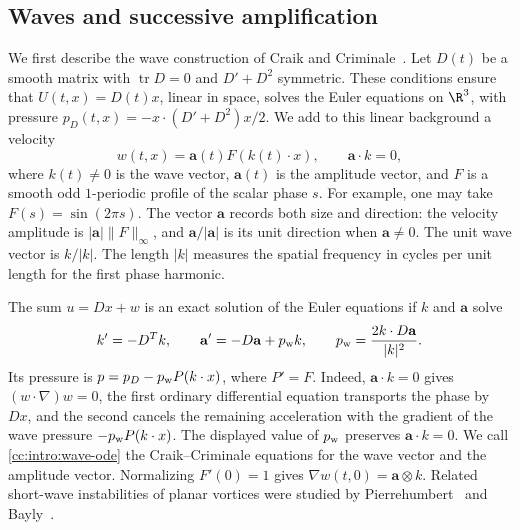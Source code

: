 \subsection{Waves and successive amplification}\label{cc:sec:intro-waves}
We first describe the wave construction of Craik and
Criminale~\cite{CraikCriminale}. Let $D(t)$ be a smooth matrix with
$\operatorname{tr}D=0$ and $D'+D^2$ symmetric. These conditions ensure that
$U(t,x)=D(t)x$, linear in space, solves the Euler equations on $\R^3$, with pressure
$p_D(t,x)=-x\cdot(D'+D^2)x/2$. We add to this linear background a velocity
\[
 w(t,x)=\mathbf a(t)F(k(t)\cdot x),\qquad \mathbf a\cdot k=0,
\]
where $k(t)\ne0$ is the wave vector, $\mathbf a(t)$ is the amplitude
vector, and $F$ is a smooth odd $1$-periodic profile of the scalar phase $s$.
For example, one may take $F(s)=\sin(2\pi s)$. The vector $\mathbf a$
records both size and direction: the velocity amplitude is $|\mathbf a|\|F\|_\infty$, and
$\mathbf a/|\mathbf a|$ is its unit direction when $\mathbf a\ne0$.
The unit wave vector is $k/|k|$. The length $|k|$ measures the spatial
frequency in cycles per unit length for the first phase harmonic.

The sum $u=Dx+w$ is an exact solution of the Euler equations if $k$ and $\mathbf a$ solve
\begin{equation}\label{cc:intro:wave-ode}
 k'=-D^Tk,\qquad
 \mathbf a'=-D\mathbf a+p_{\rm w} k,\qquad
 p_{\rm w}=\frac{2k\cdot D\mathbf a}{|k|^2}.
\end{equation}
Its pressure is $p=p_D-p_{\rm w} P(k\cdot x)$, where $P'=F$.
Indeed, $\mathbf a\cdot k=0$ gives $(w\cdot\nabla)w=0$, the first
ordinary differential equation transports the phase by $Dx$, and the
second cancels the remaining acceleration with the gradient of the
wave pressure $-p_{\rm w}P(k\cdot x)$.
The displayed value of $p_{\rm w}$ preserves $\mathbf a\cdot k=0$.
We call \eqref{cc:intro:wave-ode} the Craik--Criminale equations for the
wave vector and the amplitude vector. Normalizing $F'(0)=1$ gives
$\nabla w(t,0)=\mathbf a\otimes k$.
Related short-wave instabilities of planar vortices were studied by
Pierrehumbert~\cite{Pierrehumbert1986} and Bayly~\cite{Bayly1986}.

